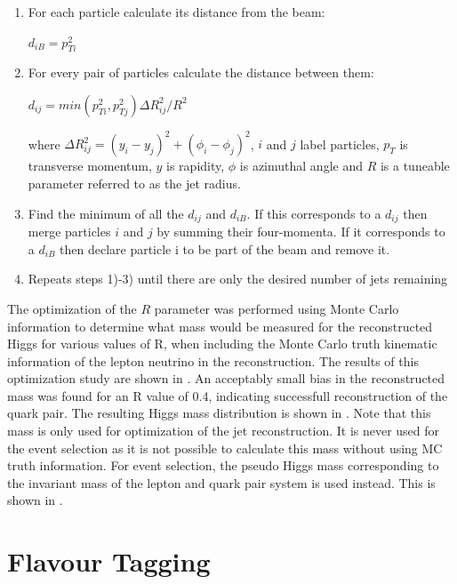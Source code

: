 \begin{enumerate}
\item For each particle calculate its distance from the beam:
\begin{center}
  $d_{iB} = p_{Ti}^2$
\end{center}
\item For every pair of particles calculate the distance between them:
\begin{center}
  $d_{ij}=min(p_{Ti}^2,p_{Tj}^2)\Delta R_{ij}^2/R^2$
\end{center}
where $\Delta R_{ij}^2=(y_i-y_j)^2 + (\phi_i-\phi_j)^2$, $i$ and $j$ label particles, $p_T$ is transverse momentum, $y$ is rapidity, $\phi$ is azimuthal angle and $R$ is a tuneable parameter referred to as the jet radius.
\item Find the minimum of all the $d_{ij}$ and $d_{iB}$. If this corresponds to a $d_{ij}$ then merge particles $i$ and $j$ by summing their four-momenta. If it corresponds to a $d_{iB}$ then declare particle i to be part of the beam and remove it.
\item Repeats steps 1)-3) until there are only the desired number of jets remaining
\end{enumerate}

The optimization of the $R$ parameter was performed using Monte Carlo information to determine what mass would be measured for the reconstructed Higgs for various values of R, when including the Monte Carlo truth kinematic information of the lepton neutrino in the reconstruction. The results of this optimization study are shown in . An acceptably small bias in the reconstructed mass was found for an R value of 0.4, indicating successfull reconstruction of the quark pair. The resulting Higgs mass distribution is shown in . Note that this mass is only used for optimization of the jet reconstruction. It is never used for the event selection as it is not possible to calculate this mass without using MC truth information. For event selection, the pseudo Higgs mass corresponding to the invariant mass of the lepton and quark pair system is used instead. This is shown in .



\section{Flavour Tagging}

